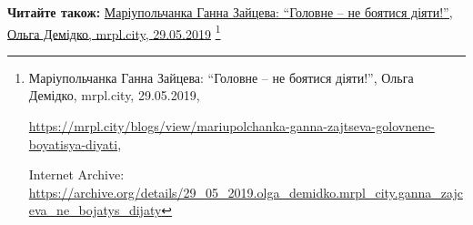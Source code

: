  
 
 
 
 

\def\pubIA{https://archive.org/details/29_05_2019.olga_demidko.mrpl_city.ganna_zajceva_ne_bojatys_dijaty}
\def\pubTitle{Маріупольчанка Ганна Зайцева: \enquote{Головне – не боятися діяти!}}
\def\pubDate{29.05.2019}
\def\pubOrigin{https://mrpl.city/blogs/view/mariupolchanka-ganna-zajtseva-golovnene-boyatisya-diyati}
\def\pubAuthor{Ольга Демідко}

\textbf{Читайте також:} \href{\pubIA}{%
\pubTitle, \pubAuthor, mrpl.city, \pubDate}%
\footnote{\pubTitle, \pubAuthor, mrpl.city, \pubDate, \par\url{\pubOrigin}, \par Internet Archive: \url{\pubIA}}
